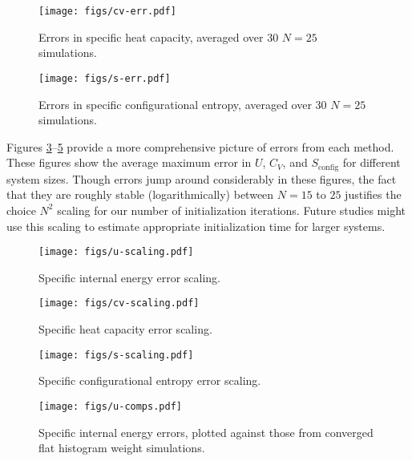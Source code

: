\documentclass[11pt]{article}
\renewcommand{\t}{\text} %
\begin{document}
\begin{figure}
  \centering
  \texttt{[image: figs/cv-err.pdf]}
  \caption[Heat capacity error scaling]
  {Errors in specific heat capacity, averaged over 30 $N=25$
    simulations.}
  \label{fig:heat_capacity_err}
\end{figure}

\begin{figure}
  \centering
  \texttt{[image: figs/s-err.pdf]}
  \caption[Configurational entropy error scaling]
  {Errors in specific configurational entropy, averaged over 30 $N=25$
    simulations.}
  \label{fig:config_entropy_err}
\end{figure}

Figures \ref{fig:u_scaling}--\ref{fig:s_scaling} provide a more
comprehensive picture of errors from each method. These figures show
the average maximum error in $U$, $C_V$, and $S_{\t{config}}$ for
different system sizes. Though errors jump around considerably in
these figures, the fact that they are roughly stable (logarithmically)
between $N=15$ to $25$ justifies the choice $N^2$ scaling for our
number of initialization iterations.  Future studies might use this
scaling to estimate appropriate initialization time for larger
systems.

\begin{figure}[!p]
  \centering
  \texttt{[image: figs/u-scaling.pdf]}
  \caption[Internal energy error scaling]
  {Specific internal energy error scaling.}
  \label{fig:u_scaling}
\end{figure}

\begin{figure}[!p]
  \centering
  \texttt{[image: figs/cv-scaling.pdf]}
  \caption[Heat capacity error scaling]
  {Specific heat capacity error scaling.}
  \label{fig:cv_scaling}
\end{figure}

\begin{figure}[!p]
  \centering
  \texttt{[image: figs/s-scaling.pdf]}
  \caption[Configurational entropy error scaling]
  {Specific configurational entropy error scaling.}
  \label{fig:s_scaling}
\end{figure}

\begin{figure}[!p]
  \centering
  \texttt{[image: figs/u-comps.pdf]}
  \caption[Internal energy error comparisons]
  {Specific internal energy errors, plotted against those from
    converged flat histogram weight simulations.}
  \label{fig:u_comps}
\end{figure}
\end{document}
